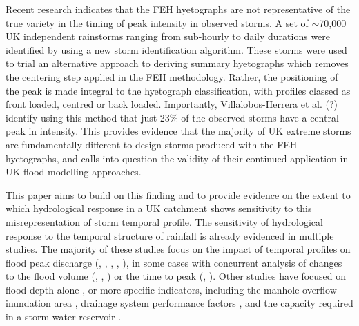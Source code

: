 \documentclass[APA,Times2COL]{WileyNJDv5}
\begin{document}
Recent research indicates that the FEH hyetographs are not representative of the true variety in the timing of peak intensity in observed storms. A set of $\sim$70,000 UK independent rainstorms ranging from sub-hourly to daily durations were identified by \citet{herrera2023creation} using a new storm identification algorithm. These storms were used to trial an alternative approach to deriving summary hyetographs which removes the centering step applied in the FEH methodology. Rather, the positioning of the peak is made integral to the hyetograph classification, with profiles classed as front loaded, centred or back loaded. Importantly, Villalobos-Herrera et al. (?) identify using this method that just 23\% of the observed storms have a central peak in intensity. This provides evidence that the majority of UK extreme storms are fundamentally different to design storms produced with the FEH hyetographs, and calls into question the validity of their continued application in UK flood modelling approaches. 



This paper aims to build on this finding and to provide evidence on the extent to which hydrological response in a UK catchment shows sensitivity to this misrepresentation of storm temporal profile. The sensitivity of hydrological response to the temporal structure of rainfall is already evidenced in multiple studies. The majority of these studies focus on the impact of temporal profiles on flood peak discharge (\citet{fatone2021advanced}, \citet{dullo2017evaluation}, \citet{maca2009influence}, \citet{fadhel2018sensitivity}, \citet{wasko2015steeper}), in some cases with concurrent analysis of changes to the flood volume (\citet{lambourne1987model}, \citet{nguyen2010optimal}, \citet{peyron2002optimal}) or the time to peak (\citet{balbastre2019comparison}, \citet{ball1992influence}). Other studies have focused on flood depth alone \citep{hettiarachchi2018increase}, or more specific indicators, including the manhole overflow inundation area \citep{li2021case}, drainage system performance factors \citep{ng2020design}, and the capacity required in a storm water reservoir  \citep{pochwat2017temporal}. 
\end{document}
